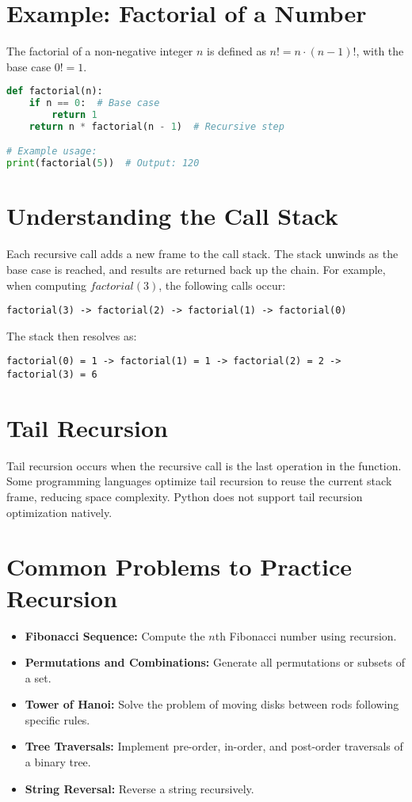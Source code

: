 \section*{Example: Factorial of a Number}
The factorial of a non-negative integer \( n \) is defined as \( n! = n \cdot (n-1)! \), with the base case \( 0! = 1 \).

\begin{fullwidth}
\begin{lstlisting}[language=Python]
def factorial(n):
    if n == 0:  # Base case
        return 1
    return n * factorial(n - 1)  # Recursive step

# Example usage:
print(factorial(5))  # Output: 120
\end{lstlisting}
\end{fullwidth}

\section*{Understanding the Call Stack}
Each recursive call adds a new frame to the call stack. The stack unwinds as the base case is reached, and results are returned back up the chain. For example, when computing \( factorial(3) \), the following calls occur:
\begin{verbatim}
factorial(3) -> factorial(2) -> factorial(1) -> factorial(0)
\end{verbatim}
The stack then resolves as:
\begin{verbatim}
factorial(0) = 1 -> factorial(1) = 1 -> factorial(2) = 2 -> factorial(3) = 6
\end{verbatim}

\section*{Tail Recursion}
Tail recursion occurs when the recursive call is the last operation in the function. Some programming languages optimize tail recursion to reuse the current stack frame, reducing space complexity. Python does not support tail recursion optimization natively.

\section*{Common Problems to Practice Recursion}
\begin{itemize}
    \item \textbf{Fibonacci Sequence:} Compute the \(n\)th Fibonacci number using recursion.
    \item \textbf{Permutations and Combinations:} Generate all permutations or subsets of a set.
    \item \textbf{Tower of Hanoi:} Solve the problem of moving disks between rods following specific rules.
    \item \textbf{Tree Traversals:} Implement pre-order, in-order, and post-order traversals of a binary tree.
    \item \textbf{String Reversal:} Reverse a string recursively.
\end{itemize}

